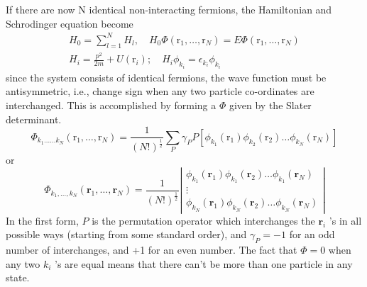 If there are now N identical non-interacting fermions, the Hamiltonian and Schrodinger equation become
\begin{equation}\begin{array}{c}
H_{0}=\sum_{l=1}^{N} H_{l}, \quad H_{0} \Phi\left(\mathrm{r}_{1}, \ldots, \mathrm{r}_{N}\right)=E \Phi\left(\mathrm{r}_{1}, \ldots, \mathrm{r}_{N}\right) \\
H_{i}=\frac{p^{2}}{2 m}+U\left(\mathrm{r}_{i}\right) ; \quad H_{i} \phi_{k_{i}}=\epsilon_{k_{i}} \phi_{k_{i}}
\end{array}\end{equation}
since the system consists of identical fermions, the wave function must be antisymmetric, i.e., change sign when any two particle co-ordinates are interchanged. This is accomplished by forming a $\Phi$ given by the Slater determinant.
\begin{equation}\Phi_{k_{1} \ldots \ldots k_{N}}\left(\mathrm{r}_{1}, \ldots, \mathrm{r}_{N}\right)=\frac{1}{(N !)^{\frac{1}{2}}} \sum_{P} \gamma_{P} P\left[\phi_{k_{1}}\left(\mathrm{r}_{1}\right) \phi_{k_{2}}\left(\mathrm{r}_{2}\right) \ldots \phi_{k_{N}}\left(\mathrm{r}_{N}\right)\right]\end{equation}
or
\begin{equation}\Phi_{k_{1}, \ldots, k_{N}}\left(\mathbf{r}_{1}, \ldots, \mathbf{r}_{N}\right)=\frac{1}{(N !)^{\frac{1}{2}}}\left|\begin{array}{c}
\phi_{k_{1}}\left(\mathbf{r}_{1}\right) \phi_{k_{1}}\left(\mathbf{r}_{2}\right) \ldots \phi_{k_{1}}\left(\mathbf{r}_{N}\right) \\
\vdots \\
\phi_{k_{N}}\left(\mathbf{r}_{1}\right) \phi_{k_{N}}\left(\mathbf{r}_{2}\right) \dots \phi_{k_{N}}\left(\mathbf{r}_{N}\right)
\end{array}\right|
\label{slater-determinant-2}
\end{equation}
In the first form, $P$ is the permutation operator which interchanges the $\mathbf{r}_{i}$ 's in all possible ways (starting from some standard order), and $\gamma_{P}=-1$ for an odd number of interchanges, and +1 for an even number. The fact that $\Phi=0$ when any two $k_{i}$ 's are equal means that there can't be more than one particle in any state.

